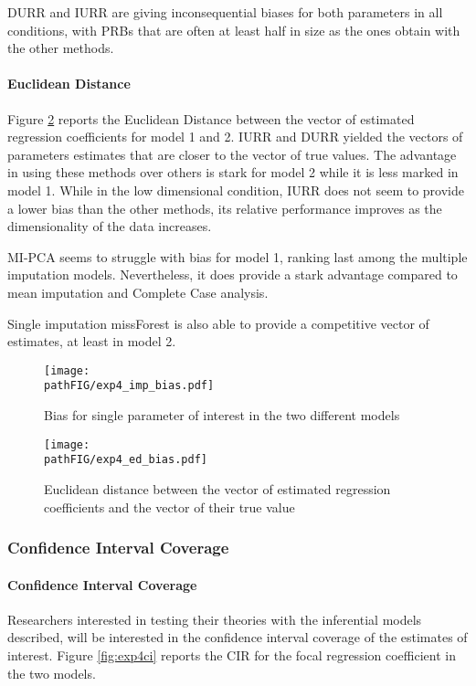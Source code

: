 	DURR and IURR are giving inconsequential biases for both parameters in all conditions, with PRBs that are
	often at least half in size as the ones obtain with the other methods.

	\paragraph{Euclidean Distance}
	Figure \ref{fig:exp4biased} reports the Euclidean Distance between the vector of estimated regression 
	coefficients for model 1 and 2.
	IURR and DURR yielded the vectors of parameters estimates that are closer to the vector of true values.
	The advantage in using these methods over others is stark for model 2 while it is less marked in model 1.
	While in the low dimensional condition, IURR does not seem to provide a lower bias than the other 
	methods, its relative performance improves as the dimensionality of the data increases.

	MI-PCA seems to struggle with bias for model 1, ranking last among the multiple imputation models.
	Nevertheless, it does provide a stark advantage compared to mean imputation and Complete Case analysis.

	Single imputation missForest is also able to provide a competitive vector of estimates, at least in model 2.

\begin{figure}
	\texttt{[image: \\pathFIG/exp4\_imp\_bias.pdf]}
	\caption{Bias for single parameter of interest in the two different models}
	\label{fig:exp4bias}
\end{figure}

\begin{figure}
	\texttt{[image: \\pathFIG/exp4\_ed\_bias.pdf]}
	\caption{Euclidean distance between the vector of estimated regression coefficients and
		the vector of their true value}
	\label{fig:exp4biased}
\end{figure}

\FloatBarrier

\subsubsection{Confidence Interval Coverage}

	\paragraph{Confidence Interval Coverage}
	Researchers interested in testing their theories with the inferential models described, will be interested
	in the confidence interval coverage of the estimates of interest.
	Figure \ref{fig:exp4ci} reports the CIR for the focal regression coefficient in the two models.

